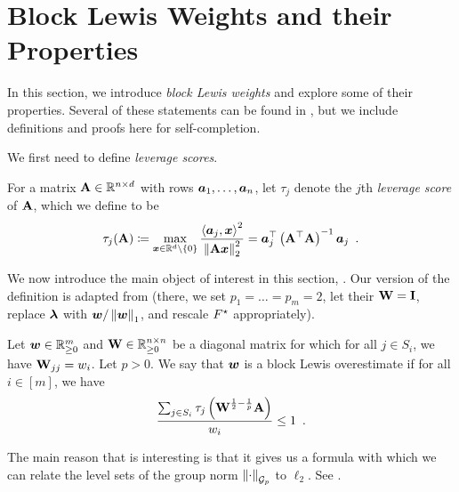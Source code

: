 \section{Block Lewis Weights and their Properties}
\label{sec:blw_to_l2}

In this section, we introduce \textit{block Lewis weights} and explore some of their properties. Several of these statements can be found in \cite{jlls23,mo23}, but we include definitions and proofs here for self-completion.

We first need to define \textit{leverage scores}.

\begin{definition}
\label{defn:leverage_score}
For a matrix $\mathbf{A}\in\mathbb{R}^{n \times d}$ with rows $\bm{a}_1,\dots,\bm{a}_n$, let $\tau_j$ denote the $j$th \textit{leverage score} of $\mathbf{A}$, which we define to be
\begin{align*}
    \tau_j(\mathbf{A}) \coloneqq \max_{\bm{x}\in\mathbb{R}^d\setminus \left\{0\right\}} \frac{\left\langle \bm{a}_j,\bm{x} \right\rangle^2}{\left\lVert \mathbf{A}\bm{x} \right\rVert_2^2} = \bm{a}_j^{\top}\left(\mathbf{A}^{\top}\mathbf{A}\right)^{-1}\bm{a}_j\enspace.
\end{align*}
\end{definition}

We now introduce the main object of interest in this section, . Our version of the definition is adapted from \cite[Definition 1.2]{mo23} (there, we set $p_1=\dots=p_m=2$, let their $\mathbf{W} = \mathbf{I}$, replace $\bm{\lambda}$ with $\bm{w}/\left\lVert \bm{w} \right\rVert_1$, and rescale $F^{\star}$ appropriately).

\begin{definition}
\label{defn:blw}
Let $\bm{w} \in \mathbb{R}^m_{\ge 0}$ and $\mathbf{W} \in \mathbb{R}^{n \times n}_{\ge 0}$ be a diagonal matrix for which for all $j \in S_i$, we have $\mathbf{W}_{jj} = w_i$. Let $p > 0$. We say that $\bm{w}$ is a block Lewis overestimate if for all $i \in [m]$, we have
\begin{align*}
    \frac{\sum_{j \in S_i} \tau_j\left(\mathbf{W}^{\frac{1}{2}-\frac{1}{p}}\mathbf{A}\right)}{w_i} \le 1\enspace.
\end{align*}
\end{definition}

The main reason that  is interesting is that it gives us a formula with which we can relate the level sets of the group norm $\left\lVert \cdot \right\rVert_{\mathcal{G}_{p}}$ to $\ell_2$. See . %

